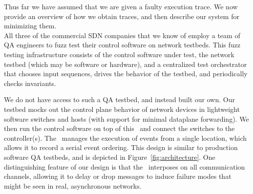 
Thus far we have assumed that we are given a faulty execution
trace. We now provide an overview of
how we obtain traces, and then describe our system for
minimizing them.\\[0.5ex]
%
 All three of the commercial SDN companies
that we know of employ a team of QA
engineers to fuzz test their control software on network testbeds.
This fuzz testing infrastructure
consists of the control software under test, the network testbed (which may
be software or hardware), and a centralized
test orchestrator
that chooses input sequences, drives the behavior of the testbed,
and periodically checks invariants. %


We do not have access to such a QA testbed, and instead built our own.
Our testbed mocks out the control plane
behavior of network devices in lightweight software switches and hosts (with
support for minimal dataplane forwarding).
We then run the control software on
top of this \tester~and connect the switches to the
controller(s). The \tester~manages the execution of events from a single location,
which allows it to record a serial
event ordering. This design is similar to production software QA testbeds, and is
depicted in Figure~\ref{fig:architecture}. One distinguishing feature of our
design is that
the \tester~interposes on all communication
channels, allowing it to delay or drop
messages to induce failure modes that might be seen in
real, asynchronous networks.


